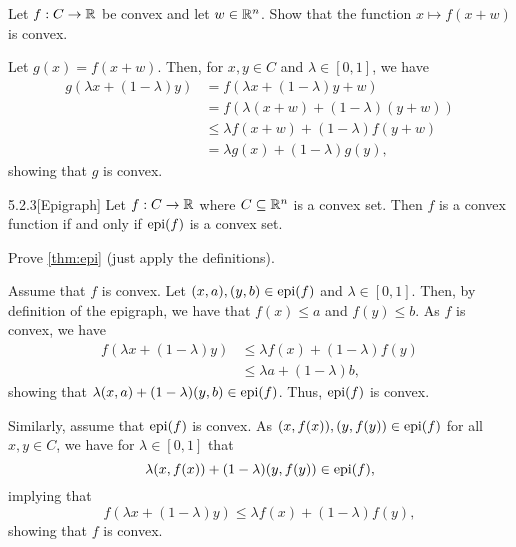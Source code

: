 \begin{exercise}
  Let $f : C \to \mathbb{R}$ be convex and let $w \in \mathbb{R}^n$.
  Show that the function $x \mapsto f(x + w)$ is convex.
\end{exercise}

\begin{solution}
  Let $g(x) = f(x + w)$.
  Then, for $x, y \in C$ and $\lambda \in [0, 1]$, we have
  \begin{align*}
    g(\lambda x + (1 - \lambda) y)
    &= f( \lambda x + (1 - \lambda) y + w ) \\
    &= f( \lambda (x + w) + (1 - \lambda) (y + w) ) \\
    &\leq \lambda f(x + w) + (1 - \lambda) f(y + w) \\
    &= \lambda g(x) + (1 - \lambda) g(y),
  \end{align*}
  showing that $g$ is convex.
\end{solution}

\begin{manualtheorem}{5.2.3}[Epigraph]\label{thm:epi}
  Let $f : C \to \mathbb{R}$ where $C \subseteq \mathbb{R}^n$ is a convex set.
  Then $f$ is a convex function if and only if $\operatorname*{epi}(f)$ is a convex set.
\end{manualtheorem}

\begin{exercise}
  Prove \cref{thm:epi} (just apply the definitions).
\end{exercise}

\begin{solution}
  Assume that $f$ is convex.
  Let $(x, a), (y, b) \in \operatorname*{epi}(f)$ and $\lambda \in [0, 1]$.
  Then, by definition of the epigraph, we have that $f(x) \leq a$ and $f(y) \leq b$.
  As $f$ is convex, we have
  \begin{align*}
    f( \lambda x + (1 - \lambda) y )
    &\leq \lambda f(x) + (1 - \lambda) f(y) \\
    &\leq \lambda a + (1 - \lambda) b,
  \end{align*}
  showing that $\lambda (x, a) + (1 - \lambda) (y, b) \in \operatorname*{epi}(f)$.
  Thus, $\operatorname*{epi}(f)$ is convex.

  Similarly, assume that $\operatorname*{epi}(f)$ is convex.
  As $(x, f(x)), (y, f(y)) \in \operatorname*{epi}(f)$ for all $x, y \in C$, we have for $\lambda \in [0, 1]$ that
  \begin{equation}
    \lambda (x, f(x)) + (1 - \lambda) (y, f(y)) \in \operatorname*{epi}(f),
  \end{equation}
  implying that
  \begin{equation}
    f( \lambda x + (1 - \lambda) y )
    \leq \lambda f(x) + (1 - \lambda) f(y),
  \end{equation}
  showing that $f$ is convex.
\end{solution}

